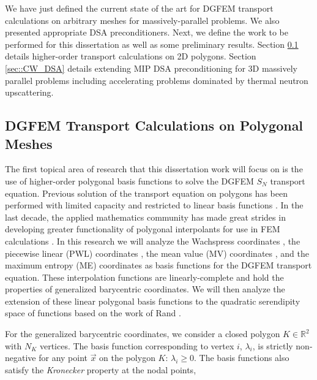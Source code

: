 \documentclass[11pt]{article}
\begin{document}
We have just defined the current state of the art for DGFEM transport calculations on arbitrary meshes for massively-parallel problems. We also presented appropriate DSA preconditioners. Next, we define the work to be performed for this dissertation as well as some preliminary results. Section \ref{sec::CW_poly} details higher-order transport calculations on 2D polygons. Section \ref{sec::CW_DSA} details extending MIP DSA preconditioning for 3D massively parallel problems including accelerating problems dominated by thermal neutron upscattering.

\subsection{DGFEM Transport Calculations on Polygonal Meshes}
\label{sec::CW_poly}

The first topical area of research that this dissertation work will focus on is the use of higher-order polygonal basis functions to solve the DGFEM $S_N$ transport equation. Previous solution of the transport equation on polygons has been performed with limited capacity and restricted to linear basis functions \cite{davidson2008finite,ref::PWLD_stone_adams,ref::PWLD_stone_adams_unstructured,bailey2008phd}. In the last decade, the applied mathematics community has made great strides in developing greater functionality of polygonal interpolants for use in FEM calculations \cite{sukumar2006recent,manzini2014new}. In this research we will analyze the Wachspress coordinates \cite{wachspress1975rational}, the piecewise linear (PWL) coordinates \cite{ref::PWLD_stone_adams}, the mean value (MV) coordinates \cite{floater2003mean,hormann2006mean}, and the maximum entropy (ME) coordinates \cite{sukumar2004construction,sukumar2005maximum,hormann2008maximum} as basis functions for the DGFEM transport equation. These interpolation functions are linearly-complete and hold the properties of generalized barycentric coordinates. We will then analyze the extension of these linear polygonal basis functions to the quadratic serendipity space of functions based on the work of Rand \cite{rand2013interpolation}.

For the generalized barycentric coordinates, we consider a closed polygon $K \in \mathbb{R}^2$ with $N_K$ vertices. The basis function corresponding to vertex $i$, $\lambda_i$, is strictly non-negative for any point $\vec{x}$ on the polygon $K$: $\lambda_i \geq 0$. The basis functions also satisfy the {\em Kronecker} property at the nodal points, 
\end{document}

